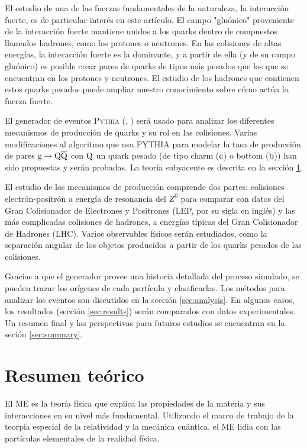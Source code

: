 \documentclass[a4paper,12pt]{article}
\begin{document}
El estudio de una de las fuerzas fundamentales de la naturaleza, la interacción fuerte, es de particular interés en este artículo. El campo "gluónico" proveniente de la interacción fuerte mantiene unidos a los quarks dentro de compuestos llamados hadrones, como los protones o neutrones. En las colisiones de altas energías, la interacción fuerte es la dominante, y a partir de ella (y de su campo gluónico) es posible crear pares de quarks de tipos más pesados que los que se encuentran en los protones y neutrones. El estudio de los hadrones que contienen estos quarks pesados puede ampliar nuestro conocimiento sobre cómo actúa la fuerza fuerte.

El generador de eventos \textsc{Pythia} (\cite{Sjostrand:2006za}, \cite{Sjostrand:2007gs}) será usado para analizar los diferentes mecanismos de producción de quarks y su rol en las colisiones. Varias modificaciones al algoritmo que usa PYTHIA para modelar la tasa de producción de pares ${\mathrm g}\to{\mathrm Q}\overline{\mathrm Q}$ con ${\mathrm Q}$ un quark pesado (de tipo charm (${\mathrm c}$) o bottom (${\mathrm b}$)) han sido propuestas y serán probadas. La teoría subyacente es descrita en la sección \ref{sec:theoretical}.

El estudio de los mecanismos de producción comprende dos partes: colisiones electrón-positrón a energía de resonancia del $Z^0$ para comparar con datos del Gran Colisionador de Electrones y Positrones (LEP, por su sigla en inglés) y las más complicadas colisiones de hadrones, a energías típicas del Gran Colisionador de Hadrones (LHC). Varios observables físicos serán estudiados, como la separación angular de los objetos producidos a partir de los quarks pesados de las colisiones.

Gracias a que el generador provee una historia detallada del proceso simulado, se pueden trazar los orígenes de cada partícula y clasificarlas. Los métodos para analizar los eventos son discutidos en la sección \ref{sec:analysis}. En algunos casos, los resultados (sección \ref{sec:results}) serán comparados con datos experimentales. Un resumen final y las perspectivas para futuros estudios se encuentran en la seción \ref{sec:summary}.

\section{Resumen teórico}
\label{sec:theoretical}

El ME es la teoría física  que explica las propiedades de la materia y sus interacciones en su nivel más fundamental. Utilizando el marco de trabajo de la teorpia especial de la relatividad y la mecánica cuántica, el ME lidia con las partículas elementales de la realidad física.
\end{document}

